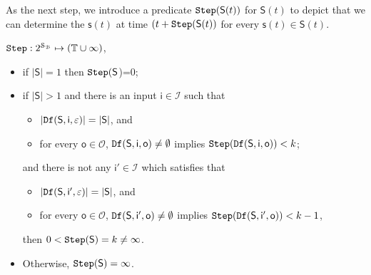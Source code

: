 As the next step, we introduce a predicate ${\tt Step}(\mathsf{S}(t))$ for $\mathsf{S}(t)$ to depict that we can determine the $\mathsf{s}(t)$ at time $(t+{\tt Step}(\mathsf{S}(t))$ for every $\mathsf{s}(t)\in \mathsf{S}(t)$. 
\begin{definition}[$\Ks(\mathsf{S})$] ${\tt Step}:2^{\mathcal{S}_{\mathcal{B}}} \mapsto (\mathbb{T}\cup\infty)$,
 \begin{itemize}
 \item   if $|\mathsf{S}|=1$ then ${\tt Step}(\mathsf{S}$)=0;
 \item  if $|\mathsf{S}|>1$ and there is an input $\mathsf{i} \in \mathcal{I}$ such that %
 \begin{itemize}
 \item  $|{\tt Df}(\mathsf{S},\mathsf{i},\varepsilon)|=|\mathsf{S}|$, and 
 \item   for every $\mathsf{o} \in \mathcal{O}$, ${\tt Df}(\mathsf{S},\mathsf{i},\mathsf{o})\ne \emptyset$ implies ${\tt Step}({\tt Df}(\mathsf{S},\mathsf{i},\mathsf{o}))< k$;
 \end{itemize} 
 and there is not any $\mathsf{i}' \in \mathcal{I}$ which satisfies that
  \begin{itemize}
 \item  $|{\tt Df}(\mathsf{S},\mathsf{i}',\varepsilon)|=|\mathsf{S}|$, and 
 \item   for every $\mathsf{o} \in \mathcal{O}$, ${\tt Df}(\mathsf{S},\mathsf{i}',\mathsf{o})\ne\emptyset$ implies ${\tt Step}({\tt Df}(\mathsf{S},\mathsf{i'},\mathsf{o}))< k-1$, 
 \end{itemize} 
then $0<{\tt Step}(\mathsf{S})=k\ne \infty$.%
 \item Otherwise, ${\tt Step}(\mathsf{S})=\infty$.
 \end{itemize}
\end{definition}

